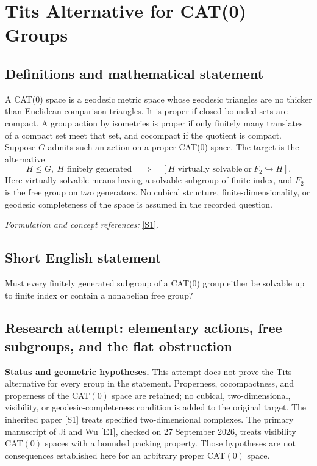 \documentclass[11pt]{article}
\begin{document}
\section*{\texorpdfstring{Tits Alternative for CAT(0) Groups}{Tits Alternative for CAT(0) Groups}}\label{statement}
\subsection{Definitions and mathematical statement}
A CAT(0) space is a geodesic metric space whose geodesic triangles are no thicker than Euclidean comparison triangles. It is proper if closed bounded sets are compact. A group action by isometries is proper if only finitely many translates of a compact set meet that set, and cocompact if the quotient is compact. Suppose $G$ admits such an action on a proper CAT(0) space. The target is the alternative
\[
 H\le G,\ H\text{ finitely generated}
 \quad\Longrightarrow\quad
 [H\text{ virtually solvable}\ \text{or}\ F_2\hookrightarrow H].
\]
Here virtually solvable means having a solvable subgroup of finite index, and $F_2$ is the free group on two generators. No cubical structure, finite-dimensionality, or geodesic completeness of the space is assumed in the recorded question.
\par\smallskip\textit{Formulation and concept references:} \href{https://www.cambridge.org/core/journals/forum-of-mathematics-pi/article/tits-alternative-for-2dimensional-mathrm-cat0-complexes/E1B5B96E5D4324F2F3707B4A05B2D86C}{[S1]}.

\subsection{Short English statement}
Must every finitely generated subgroup of a CAT(0) group either be solvable up to finite index or contain a nonabelian free group?
\subsection{Research attempt: elementary actions, free subgroups, and the flat obstruction}
\textbf{Status and geometric hypotheses.} This attempt does not prove the Tits alternative for every group in the statement. Properness, cocompactness, and properness of the CAT$(0)$ space are retained; no cubical, two-dimensional, visibility, or geodesic-completeness condition is added to the original target. The inherited paper [S1] treats specified two-dimensional complexes. The primary manuscript of Ji and Wu [E1], checked on 27 September 2026, treats visibility CAT$(0)$ spaces with a bounded packing property. Those hypotheses are not consequences established here for an arbitrary proper CAT$(0)$ space.
\end{document}
